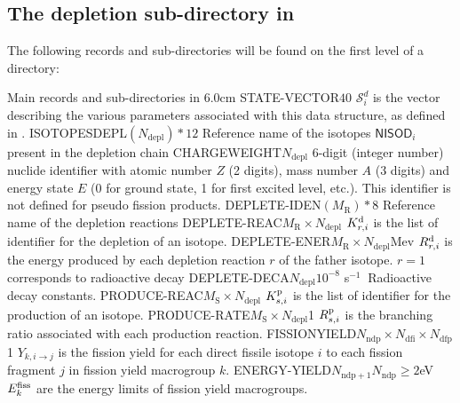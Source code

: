 \subsection{The depletion sub-directory  in
}\label{sect:microlibdirdepletion}

The following records and sub-directories will be found on the first level of a
 directory:

\begin{DescriptionEnregistrement}{Main records and sub-directories in
}{6.0cm}
\label{tabl:tabchain}
\IntEnr
  {STATE-VECTOR}{$40$}
  {$\mathcal{S}^{d}_{i}$ is the vector describing the various parameters associated with this data structure,
  as defined in .}
\CharEnr
  {ISOTOPESDEPL}{$(N_{\mathrm{depl}})*12$}
  {Reference name of the isotopes $\mathsf{NISOD}_{i}$ present in the depletion chain}
\IntEnr
  {CHARGEWEIGHT}{$N_{\mathrm{depl}}$}
  {6-digit (integer number) nuclide identifier with atomic number $Z$ (2
  digits), mass number $A$ (3 digits) and energy state $E$ (0 for ground state, 1
  for first excited level, etc.). This identifier is not defined for pseudo
  fission products.}
\CharEnr
  {DEPLETE-IDEN}{$(M_{\mathrm{R}})*8$}
  {Reference name of the depletion reactions}
\IntEnr
  {DEPLETE-REAC}{$M_{\mathrm{R}}\times N_{\mathrm{depl}}$}
  {$K_{r,i}^{\rm d}$ is the list of identifier for the depletion of an isotope.}
\RealEnr
  {DEPLETE-ENER}{$M_{\mathrm{R}}\times N_{\mathrm{depl}}$}{Mev}
  {$R_{r,i}^{\rm d}$ is the energy produced by each depletion reaction $r$ of the father isotope. $r=1$ corresponds to radioactive decay}
\RealEnr
  {DEPLETE-DECA}{$N_{\mathrm{depl}}$}{$10^{-8}$ s$^{-1}\ $}
  {Radioactive decay constants.}
\IntEnr
  {PRODUCE-REAC}{$M_{\mathrm{S}}\times N_{\mathrm{depl}}$}
  {$K_{s,i}^{\rm p}$ is the list of identifier for the production of an isotope.}
\RealEnr
  {PRODUCE-RATE}{$M_{\mathrm{S}}\times N_{\mathrm{depl}}$}{1}
  {$R_{s,i}^{\rm p}$ is the branching ratio associated with each production reaction.}
\RealEnr
  {FISSIONYIELD}{$N_{\mathrm{ndp}} \times N_{\mathrm{dfi}}\times N_{\mathrm{dfp}}$}{1}
  {$Y_{k,{i\to j}}$ is the fission yield for each direct fissile isotope $i$ to each fission fragment $j$ in fission yield
  macrogroup $k$.}
\OptRealEnr
  {ENERGY-YIELD}{$N_{\mathrm{ndp}+1}$}{$N_\mathrm{ndp}\ge 2$}{eV}
  {$E_{k}^{\rm fiss}$ are the energy limits of fission yield macrogroups.}
\end{DescriptionEnregistrement}

